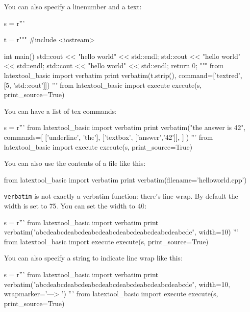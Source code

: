 You can also specify a linenumber and a text:
\begin{python}
s = r'''

t = r"""
#include <iostream>

int main()
{
    std::cout << "hello world" << std::endl;
    std::cout << "hello world" << std::endl;
    std::cout << "hello world" << std::endl;
    return 0;
}
"""
from latextool_basic import verbatim
print verbatim(t.strip(), command=['textred', [5, 'std::cout']])
'''
from latextool_basic import execute
execute(s, print_source=True)
\end{python}







\begin{samepage}
You can have a list of tex commands:
\begin{python}
s = r'''
from latextool_basic import verbatim
print verbatim("the answer is 42", 
               commands=[
                         ['underline', 'the'],
                         ['textbox', ['answer','42']],
                        ]
              )
'''
from latextool_basic import execute
execute(s, print_source=True)
\end{python}
\end{samepage}


You can also use the contents of a file like this:
\begin{console}
from latextool_basic import verbatim
print verbatim(filename='helloworld.cpp')
\end{console}


\newpage
\verb!verbatim! is not exactly a verbatim function:
there's line wrap. 
By default the width is set to 75.
You can set the width to 40:
\begin{python}
s = r'''
from latextool_basic import verbatim
print verbatim("abcdeabcdeabcdeabcdeabcdeabcdeabcdeabcdeabcde", width=10)
'''
from latextool_basic import execute
execute(s, print_source=True)
\end{python}



You can also specify a string to indicate line wrap like this:
\begin{python}
s = r'''
from latextool_basic import verbatim
print verbatim("abcdeabcdeabcdeabcdeabcdeabcdeabcdeabcdeabcde", width=10, 
               wrapmarker='---> ')
'''
from latextool_basic import execute
execute(s, print_source=True)
\end{python}



